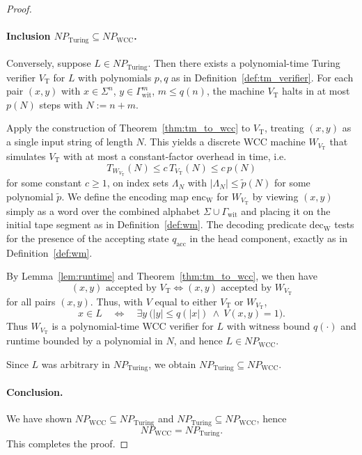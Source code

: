 \documentclass[12pt]{article}
\begin{document}
\begin{proof}
\paragraph{Inclusion $NP_{\mathrm{Turing}} \subseteq NP_{\mathrm{WCC}}$.}

Conversely, suppose $L \in NP_{\mathrm{Turing}}$. Then there exists a
polynomial-time Turing verifier $V_{\mathrm{T}}$ for $L$ with polynomials $p,q$
as in Definition~\ref{def:tm_verifier}. For each pair $(x,y)$ with
$x \in \Sigma^n$, $y \in \Gamma_{\mathrm{wit}}^{m}$, $m \le q(n)$, the machine
$V_{\mathrm{T}}$ halts in at most $p(N)$ steps with $N := n+m$.

Apply the construction of Theorem~\ref{thm:tm_to_wcc} to $V_{\mathrm{T}}$,
treating $(x,y)$ as a single input string of length $N$. This yields a discrete
WCC machine $W_{V_{\mathrm{T}}}$ that simulates $V_{\mathrm{T}}$ with at most a
constant-factor overhead in time, i.e.
\[
T_{W_{V_{\mathrm{T}}}}(N) \le c\, T_{V_{\mathrm{T}}}(N) \le c\, p(N)
\]
for some constant $c\ge 1$, on index sets $\Lambda_N$ with $|\Lambda_N| \le
\tilde{p}(N)$ for some polynomial $\tilde{p}$. We define the encoding map
$\mathrm{enc}_{\mathrm{W}}$ for $W_{V_{\mathrm{T}}}$ by viewing $(x,y)$ simply
as a word over the combined alphabet $\Sigma \cup \Gamma_{\mathrm{wit}}$ and
placing it on the initial tape segment as in Definition~\ref{def:wm}. The
decoding predicate $\mathrm{dec}_{\mathrm{W}}$ tests for the presence of the
accepting state $q_{\mathrm{acc}}$ in the head component, exactly as in
Definition~\ref{def:wm}.

By Lemma~\ref{lem:runtime} and Theorem~\ref{thm:tm_to_wcc}, we then have
\[
(x,y) \text{ accepted by } V_{\mathrm{T}}
\iff
(x,y) \text{ accepted by } W_{V_{\mathrm{T}}}
\]
for all pairs $(x,y)$. Thus, with $V$ equal to either
$V_{\mathrm{T}}$ or $W_{V_{\mathrm{T}}}$,
\[
 x\in L\quad\Longleftrightarrow\quad
 \exists y\ \bigl(|y|\le q(|x|)\ \wedge\ V(x,y)=1\bigr).
\]
Thus $W_{V_{\mathrm{T}}}$ is a polynomial-time WCC verifier for $L$ with
witness bound $q(\cdot)$ and runtime bounded by a polynomial in $N$, and hence
$L \in NP_{\mathrm{WCC}}$.

Since $L$ was arbitrary in $NP_{\mathrm{Turing}}$, we obtain
$NP_{\mathrm{Turing}} \subseteq NP_{\mathrm{WCC}}$.

\paragraph{Conclusion.}

We have shown $NP_{\mathrm{WCC}} \subseteq NP_{\mathrm{Turing}}$ and
$NP_{\mathrm{Turing}} \subseteq NP_{\mathrm{WCC}}$, hence
\[
NP_{\mathrm{WCC}} = NP_{\mathrm{Turing}}.
\]
This completes the proof.
\end{proof}
\end{document}
